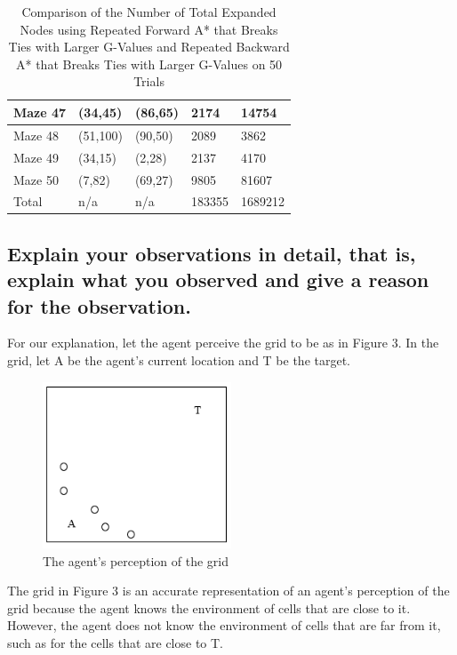 \documentclass{article}
\begin{document}
\begin{table}
{\begin{tabular}{||p{1.5cm}|p{1.5cm}|p{1.5cm}|p{3.5cm}|p{3.5cm}||}
 \hline
 Maze 47 &  (34,45) & (86,65)& 2174 & 14754\\ 
 \hline
 Maze 48 & (51,100) & (90,50)  & 2089 & 3862\\
 \hline
 Maze 49 & (34,15) & (2,28) & 2137 & 4170\\
 \hline
 Maze 50 & (7,82) & (69,27) & 9805 & 81607\\
\hline
Total & n/a & n/a & 183355 & 1689212
\\[.3ex]
 \hline
\end{tabular}}
\caption{Comparison of the Number of Total Expanded Nodes using Repeated Forward A* that Breaks Ties with Larger G-Values and Repeated Backward A* that Breaks Ties with Larger G-Values on 50 Trials} 
\end{table} 

\subsection{Explain your observations in detail, that is, explain what you observed and give a reason for the observation.}
For our explanation, let the agent perceive the grid to be as in Figure 3. In the grid, let A be the agent's current location and T be the target.\\

\begin{figure}[h!]
  \includegraphics[width=0.5\textwidth]{p3_0.png}
  \caption{The agent's perception of the grid }
\end{figure}

The grid in Figure 3 is an accurate representation of an agent's perception of the grid because the agent knows the environment of cells that are close to it. However, the agent does not know the environment of cells that are far from it, such as for the cells that are close to T.\\
\end{document}
